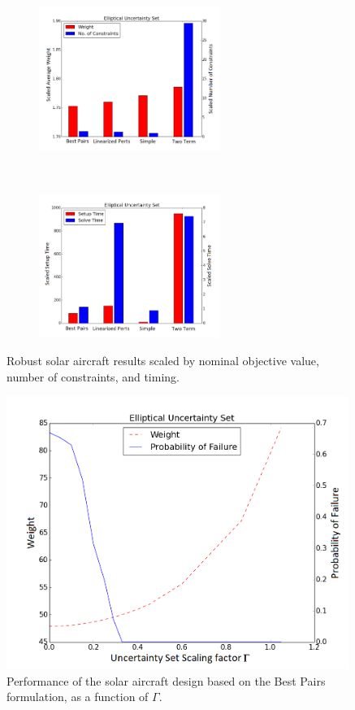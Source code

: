 \begin{figure}[h]
    \centering
    \captionsetup{justification=centering, font=small}
    \begin{subfigure}{0.49\textwidth}
        \centering
        \includegraphics[height=1.85in]{solar_results/ell_obj_cons.png}
    \end{subfigure}%
    ~ 
    \begin{subfigure}{0.49\textwidth}
        \centering
        \includegraphics[height=1.85in]{solar_results/ell_time.png}
    \end{subfigure}
    \caption{Robust solar aircraft results scaled by nominal objective value, number of constraints, and timing.}
    \label{compare_solar}
\end{figure}

\begin{figure}
    \centering
    \captionsetup{justification=centering, font=small}
    \includegraphics[height=3.5in]{solar_results/ell.png}
    \caption{Performance of the solar aircraft design based on the Best Pairs formulation, as a function of $\Gamma$.}
    \label{solar_var_gamma}
\end{figure}

